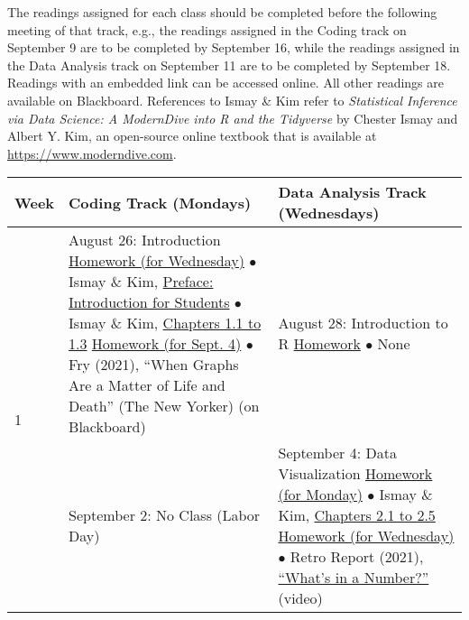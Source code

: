 \documentclass[12pt,letterpaper]{article}
\begin{document}
The readings assigned for each class should be completed before the following meeting of that track, e.g., the readings assigned in the Coding track on September 9 are to be completed by September 16, while the readings assigned in the Data Analysis track on September 11 are to be completed by September 18. Readings with an embedded link can be accessed online. All other readings are available on Blackboard. References to Ismay \& Kim refer to \emph{Statistical Inference via Data Science: A ModernDive into R and the Tidyverse} by Chester Ismay and Albert Y. Kim, an open-source online textbook that is available at \href{https://www.moderndive.com}{https://www.moderndive.com}.
\newpage
\begin{tabularx}{\textwidth}{|p{}|p{}||p{}|}
\hline
\textbf{Week} & \textbf{Coding Track (Mondays)} & \textbf{Data Analysis Track (Wednesdays)} \\


\hline
\multirow{10}{*}{1} &

August 26: Introduction \newline \newline
\ul{Homework (for Wednesday)} \newline
$\bullet$ Ismay \& Kim, \href{https://moderndive.com/preface.html\#introduction-for-students}{Preface: Introduction for Students} \newline
$\bullet$ Ismay \& Kim, \href{https://moderndive.com/1-getting-started.html}{Chapters 1.1 to 1.3} \newline \newline
\ul{Homework (for Sept. 4)} \newline
$\bullet$ Fry (2021), ``When Graphs Are a Matter of Life and Death'' (The New Yorker) (on Blackboard) &

August 28: Introduction to R \newline \newline
\ul{Homework} \newline
$\bullet$ None \\


\hline
\multirow{6}{*}{2} &

September 2: No Class (Labor Day) &

September 4: Data Visualization \newline \newline
\ul{Homework (for Monday)} \newline
$\bullet$ Ismay \& Kim, \href{https://moderndive.com/2-viz.html}{Chapters 2.1 to 2.5} \newline \newline
\ul{Homework (for Wednesday)} \newline
$\bullet$ Retro Report (2021), \href{https://www.retroreport.org/video/research-challenges-idea-that-lower-bmi-is-always-better/}{``What's in a Number?''} (video) \\


\end{tabularx}
\end{document}
